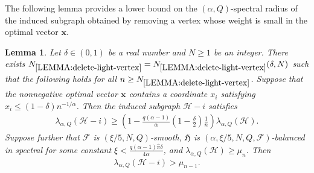 \documentclass[11pt,a4paper]{article}
\newtheorem{lemma}[definition]{Lemma}
\begin{document}
The following lemma provides a lower bound on the $(\alpha, Q)$-spectral radius of the induced subgraph obtained by removing a vertex whose weight is small in the optimal vector $\mathbf{x}$.
%
\begin{lemma}\label{LEMMA:delete-light-vertex}
    Let $\delta \in (0,1)$ be a real number and $N \ge 1$ be an integer. 
    There exists $N_{\ref{LEMMA:delete-light-vertex}} = N_{\ref{LEMMA:delete-light-vertex}}(\delta, N)$ such that the following holds for all $n \ge N_{\ref{LEMMA:delete-light-vertex}}$. 
    Suppose that the nonnegative optimal vector $\mathbf{x}$ contains a coordinate $x_i$ satisfying $x_{i} \le (1-\delta)n^{-1/\alpha}$. 
    Then the induced subgraph $\mathcal{H}-i$ satisfies 
    \begin{align}\label{equ:LEMMA:delete-light-vertex-a}
        \lambda_{\alpha, Q}\left( \mathcal{H}-i \right)
        \ge \left(1-\frac{q(\alpha-1)}{\alpha}\left(1-\frac{\delta}{2}\right)\frac{1}{n}\right) \lambda_{\alpha, Q }(\mathcal{H}).
    \end{align}
    Suppose further that $\mathcal{F}$ is $(\xi/5, N, Q)$-smooth, $\mathfrak{H}$ is $(\alpha, \xi/5, N, Q, \mathcal{F})$-balanced in spectral for some constant $\xi < \frac{q(\alpha-1) \hat{\pi} \delta}{4 \alpha}$, and $\lambda_{\alpha, Q}(\mathcal{H}) \ge \mu_{n}$.  Then
    \begin{align}\label{equ:LEMMA:delete-light-vertex-b}
        \lambda_{\alpha, Q}\left( \mathcal{H}-i \right) 
        > \mu_{n-1}. 
    \end{align}
\end{lemma}
\end{document}
